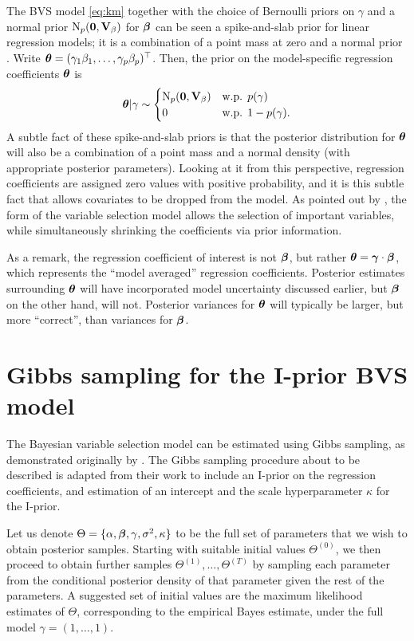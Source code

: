 \documentclass[a4paper,showframe,11pt]{report}
\begin{document}
The BVS model \cref{eq:km} together with the choice of Bernoulli priors on $\gamma$ and a normal prior $\operatorname{N}_p({\mathbf 0},{\mathbf V}_\beta)$ for ${\bm\beta}$ can be seen a spike-and-slab prior for linear regression models; it is a combination of a point mass at zero and a normal prior \citep{mitchell1988bayesian,geweke1996variable}.
Write ${\bm\theta} = (\gamma_1\beta_1,\dots,\gamma_p\beta_p)^\top$.
Then, the prior on the model-specific regression coefficients ${\bm\theta}$ is
\[
  {\bm\theta}|\gamma \sim
  \begin{cases}
    \operatorname{N}_p({\mathbf 0},{\mathbf V}_\beta) & \text{w.p. } p(\gamma) \\
    0 & \text{w.p. } 1 - p(\gamma).
  \end{cases}
\]
A subtle fact of these spike-and-slab priors is that the posterior distribution for ${\bm\theta}$ will also be a combination of a point mass and a normal density (with appropriate posterior parameters).
Looking at it from this perspective, regression coefficients are assigned zero values with positive probability, and it is this subtle fact that allows covariates to be dropped from the model.
As pointed out by \citet{Kuo1998}, the form of the variable selection model allows the selection of important variables, while simultaneously shrinking the coefficients via prior information.

As a remark, the regression coefficient of interest is not ${\bm\beta}$, but rather ${\bm\theta} = {\bm\gamma} \cdot {\bm\beta}$, which represents the ``model averaged'' regression coefficients.
Posterior estimates surrounding ${\bm\theta}$ will have incorporated model uncertainty discussed earlier, but ${\bm\beta}$ on the other hand, will not.
Posterior variances for ${\bm\theta}$ will typically be larger, but more ``correct'', than variances for ${\bm\beta}$.

\section{Gibbs sampling for the I-prior BVS model}

The Bayesian variable selection model can be estimated using Gibbs sampling, as demonstrated originally by \citet{Kuo1998}.
The Gibbs sampling procedure about to be described is adapted from their work to include an I-prior on the regression coefficients, and estimation of an intercept and the scale hyperparameter $\kappa$ for the I-prior.

Let us denote $\Theta=\{\alpha,{\bm\beta},\gamma,\sigma^2,\kappa\}$ to be the full set of parameters that we wish to obtain posterior samples.
Starting with suitable initial values $\Theta^{(0)}$, we then proceed to obtain further samples $\Theta^{(1)}, \dots, \Theta^{(T)}$ by sampling each parameter from the conditional posterior density of that parameter given the rest of the parameters.
A suggested set of initial values are the maximum likelihood estimates of $\Theta$, corresponding to the empirical Bayes estimate, under the full model $\gamma=(1,\dots,1)$.
\end{document}
